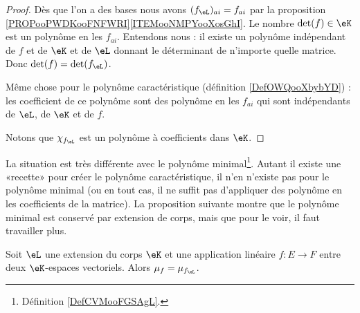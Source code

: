 \begin{proof}
    Dès que l'on a des bases nous avons \( (f_{\eL})_{ai}=f_{ai}\) par la proposition \ref{PROPooPWDKooFNFWRI}\ref{ITEMooNMPYooXosGhI}. Le nombre \( \det(f)\in \eK\) est un polynôme en les \( f_{ai}\). Entendons nous : il existe un polynôme indépendant de \( f\) et de \( \eK\) et de \( \eL\) donnant le déterminant de n'importe quelle matrice. Donc \( \det(f)=\det(f_{\eL})\).

    Même chose pour le polynôme caractéristique (définition \ref{DefOWQooXbybYD}) : les coefficient de ce polynôme sont des polynôme en les \( f_{ai}\) qui sont indépendants de \( \eL\), de \( \eK\) et de \( f\).

    Notons que \( \chi_{f_{\eL}}\) est un polynôme à coefficients dans \( \eK\).
\end{proof}

La situation est très différente avec le polynôme minimal\footnote{Définition \ref{DefCVMooFGSAgL}.}. Autant il existe une «recette» pour créer le polynôme caractéristique, il n'en n'existe pas pour le polynôme minimal (ou en tout cas, il ne suffit pas d'appliquer des polynôme en les coefficients de la matrice). La proposition suivante montre que le polynôme minimal est conservé par extension de corps, mais que pour le voir, il faut travailler plus.

\begin{proposition}      \label{PROPooXVZMooXcJrsJ}
    Soit \( \eL\) une extension du corps \( \eK\) et une application linéaire \( f\colon E\to F\) entre deux \( \eK\)-espaces vectoriels. Alors \( \mu_f=\mu_{f_{\eL}}\).
\end{proposition}

